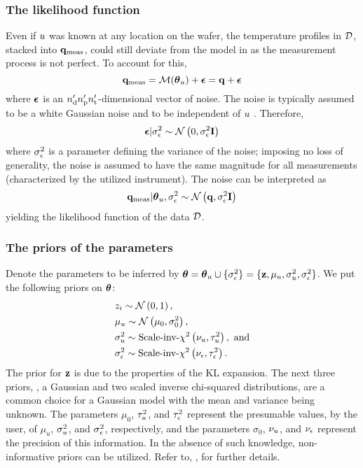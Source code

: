\subsubsection{The likelihood function}
Even if $u$ was known at any location on the wafer, the temperature profiles in $\mathcal{D}$, stacked into $\mathbf{q}_{\text{meas}}$, could still deviate from the model in  as the measurement process is not perfect. To account for this,
\[
  \mvT_\meas = \model{\vparam_\u} + \vnoise = \mvT + \vnoise
\]
where $\boldsymbol\epsilon$ is an ${n_\text{d}'} {n_\text{p}'} {n_\text{t}'}$-dimensional vector of noise. The noise is typically assumed to be a white Gaussian noise and to be independent of $u$ \cite{rasmussen2006, marzouk2009}. Therefore,
\[
  \boldsymbol\epsilon | \sigma^2_\epsilon \sim \mathcal{N}\left( 0, \sigma^2_\epsilon \mathbf{I} \right)
\]
where $\sigma^2_\epsilon$ is a parameter defining the variance of the noise; imposing no loss of generality, the noise is assumed to have the same magnitude for all measurements (characterized by the utilized instrument). The noise can be interpreted as
\begin{equation} \elabel{likelihood}
  \mvT_\meas | \vparam_\u, \sigma_\noise^2 \sim \gaussian{\mvT}{\sigma_\noise^2 \mI}
\end{equation}
yielding the likelihood function of the data $\mathcal{D}$.

\subsubsection{The priors of the parameters}
Denote the parameters to be inferred by ${\boldsymbol\theta} = {\boldsymbol\theta}_u \cup \{ \sigma_\epsilon^2 \} = \{ \mathbf{z}, \mu_u, \sigma_u^2, \sigma_\epsilon^2 \}$. We put the following priors on ${\boldsymbol\theta}$:
\begin{align}
  & \z_i \sim \gaussian{0}{1}, \elabel{z-prior} \\
  & \mu_\u \sim \gaussian{\mu_0}{\sigma^2_0}, \elabel{mu-u-prior} \\
  & \sigma^2_\u \sim \sichisquared{\nu_\u}{\tau^2_\u}, \text{ and} \elabel{sigma2-u-prior} \\
  & \sigma^2_\noise \sim \sichisquared{\nu_\noise}{\tau^2_\noise}. \elabel{sigma2-noise-prior}
\end{align}
The prior for $\mathbf{z}$ is due to the properties of the KL expansion. The next three priors, \ie, a Gaussian and two scaled inverse chi-squared distributions, are a common choice for a Gaussian model with the mean and variance being unknown. The parameters $\mu_0$, $\tau^2_u$, and $\tau^2_\epsilon$ represent the presumable values, by the user, of $\mu_u$, $\sigma^2_u$, and $\sigma^2_\epsilon$, respectively, and the parameters $\sigma_0$, $\nu_u$, and $\nu_\epsilon$ represent the precision of this information. In the absence of such knowledge, non-informative priors can be utilized. Refer to, \eg, \cite{gelman2004, bernardo2007} for further details.

